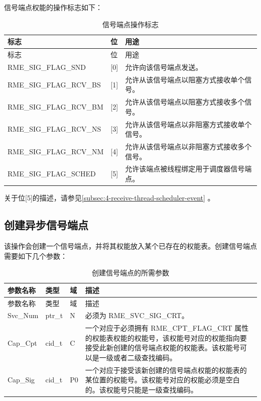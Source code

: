 信号端点权能的操作标志如下：

\begin{xltabular}{\textwidth}{@{}>{\hsize\raggedright\arraybackslash}X>{\hsize\raggedright\arraybackslash}X>{\hsize\raggedright\arraybackslash}X@{}}
\caption{信号端点操作标志}\label{tab:5-15-signal-endpoint-operation-flags}\\
\toprule
标志 & 位 & 用途\tabularnewline
\endfirsthead
\toprule
标志 & 位 & 用途\tabularnewline
\midrule
\endhead
\bottomrule
\endlastfoot
RME\_SIG\_FLAG\_SND & {[}0{]} & 允许向该信号端点发送。\tabularnewline
RME\_SIG\_FLAG\_RCV\_BS & {[}1{]} &
允许从该信号端点以阻塞方式接收单个信号。\tabularnewline
RME\_SIG\_FLAG\_RCV\_BM & {[}2{]} &
允许从该信号端点以阻塞方式接收多个信号。\tabularnewline
RME\_SIG\_FLAG\_RCV\_NS & {[}3{]} &
允许从该信号端点以非阻塞方式接收单个信号。\tabularnewline
RME\_SIG\_FLAG\_RCV\_NM & {[}4{]} &
允许从该信号端点以非阻塞方式接收多个信号。\tabularnewline
RME\_SIG\_FLAG\_SCHED & {[}5{]} &
允许该端点被线程绑定用于调度器信号端点。\tabularnewline
\end{xltabular}

关于位{[}5{]}的描述，请参见\ref{subsec:4-receive-thread-scheduler-event}
。

\subsection{创建异步信号端点}\label{subsec:5-create-async-signal-endpoint}

该操作会创建一个信号端点，并将其权能放入某个已存在的权能表。创建信号端点需要如下几个参数：

\begin{xltabular}{\textwidth}{@{}>{\hsize\raggedright\arraybackslash}X>{\hsize\raggedright\arraybackslash}X>{\hsize\raggedright\arraybackslash}X>{\hsize\raggedright\arraybackslash}X@{}}
\caption{创建信号端点的所需参数}\label{tab:5-16-create-signal-endpoint-parameters}\\
\toprule
参数名称 & 类型 & 域 & 描述\tabularnewline
\endfirsthead
\toprule
参数名称 & 类型 & 域 & 描述\tabularnewline
\midrule
\endhead
\bottomrule
\endlastfoot
Svc\_Num & ptr\_t & N & 必须为 RME\_SVC\_SIG\_CRT。\tabularnewline
Cap\_Cpt & cid\_t & C &
一个对应于必须拥有 RME\_CPT\_FLAG\_CRT 属性的权能表权能的权能号，该权能号对应的权能指向要接受此新创建的信号端点权能的权能表。该权能号可以是一级或者二级查找编码。\tabularnewline
Cap\_Sig & cid\_t & P0 &
一个对应于接受该新创建的信号端点权能的权能表的某位置的权能号。该权能号对应的权能必须是空白的。该权能号只能是一级查找编码。\tabularnewline
\end{xltabular}

